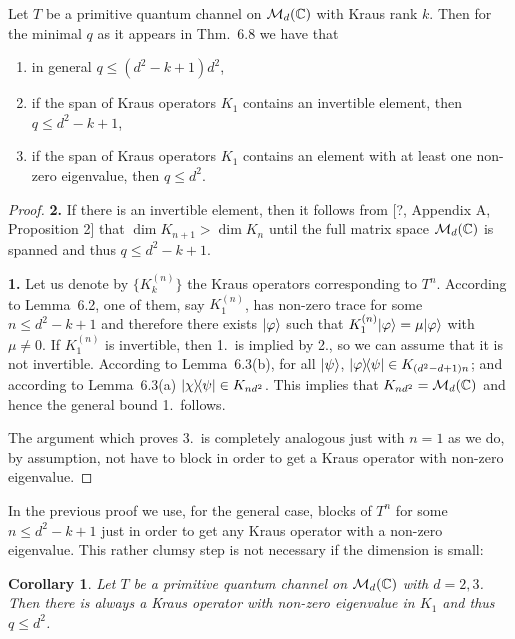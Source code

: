 \documentclass[11pt,a4paper]{article}
\theoremstyle{plain}
\newtheorem{corollary}{Corollary}[section]
\theoremstyle{definition}
\theoremstyle{remark}
\begin{document}
\begin{theorem}
    Let $T$ be a primitive quantum channel on $\mathcal{M}_d(\mathbb{C})$ with Kraus rank $k$. Then
    for the minimal $q$ as it appears in Thm.~6.8 we have that
    \begin{enumerate}
        \item in general $q\le (d^2-k+1)d^2$,
        \item if the span of Kraus operators $K_1$ contains an invertible element, then
              $q\le d^2-k+1$,
        \item if the span of Kraus operators $K_1$ contains an element with at least one
              non-zero eigenvalue, then $q\le d^2$.
    \end{enumerate}
\end{theorem}

\begin{proof}
    \textbf{2.} If there is an invertible element, then it follows from [?, Appendix A,
            Proposition 2] that $\dim K_{n+1}>\dim K_n$ until the full matrix space $\mathcal{M}_d(\mathbb{C})$ is
    spanned and thus $q\le d^2-k+1$.

    \textbf{1.} Let us denote by $\{K^{(n)}_k\}$ the Kraus operators corresponding to
    $T^n$. According to Lemma~6.2, one of them, say $K^{(n)}_1$, has non-zero trace for
    some $n\le d^2-k+1$ and therefore there exists $|\varphi\rangle$ such that
    $K^{(n)}_1|\varphi\rangle=\mu|\varphi\rangle$ with $\mu\neq 0$. If $K^{(n)}_1$ is
    invertible, then 1.\ is implied by 2., so we can assume that it is not invertible.
    According to Lemma~6.3(b), for all $|\psi\rangle$, $|\varphi\rangle\!\langle\psi|\in
        K_{(d^2-d+1)n}$; and according to Lemma~6.3(a) $|\chi\rangle\!\langle\psi|\in K_{nd^2}$.
    This implies that $K_{nd^2}=\mathcal{M}_d(\mathbb{C})$ and hence the general bound 1.\ follows.

    The argument which proves 3.\ is completely analogous just with $n=1$ as we do,
    by assumption, not have to block in order to get a Kraus operator with non-zero
    eigenvalue.
\end{proof}

In the previous proof we use, for the general case, blocks of $T^n$ for some
$n\le d^2-k+1$ just in order to get any Kraus operator with a non-zero
eigenvalue. This rather clumsy step is not necessary if the dimension is small:

\begin{corollary}
    Let $T$ be a primitive quantum channel on $\mathcal{M}_d(\mathbb{C})$ with $d=2,3$. Then there
    is always a Kraus operator with non-zero eigenvalue in $K_1$ and thus $q\le d^2$.
\end{corollary}
\end{document}
